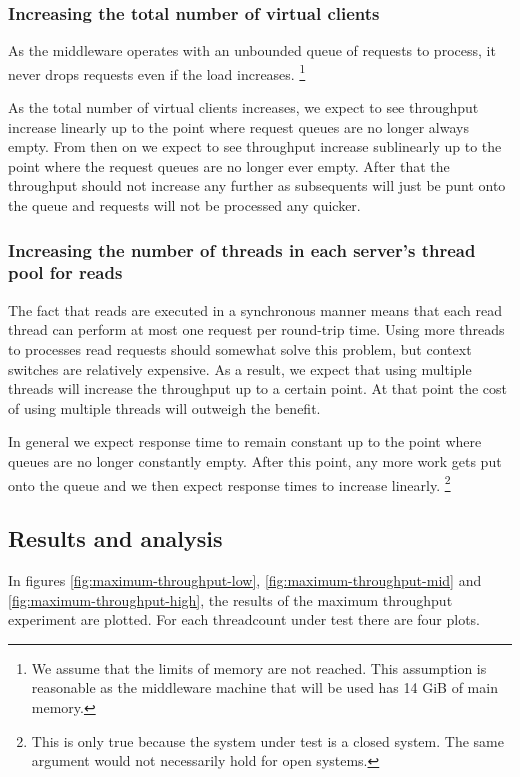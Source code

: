 \documentclass[11pt]{article}
\begin{document}
\subsubsection{Increasing the total number of virtual clients}

As the middleware operates with an unbounded queue of requests to process, it never drops requests even if the load increases.
\footnote{
  We assume that the limits of memory are not reached.
  This assumption is reasonable as the middleware machine that will be used has 14 GiB of main memory.
}

As the total number of virtual clients increases, we expect to see throughput increase linearly up to the point where request queues are no longer always empty.
From then on we expect to see throughput increase sublinearly up to the point where the request queues are no longer ever empty.
After that the throughput should not increase any further as subsequents will just be punt onto the queue and requests will not be processed any quicker.

\subsubsection{Increasing the number of threads in each server's thread pool for reads}

The fact that reads are executed in a synchronous manner means that each read thread can perform at most one request per round-trip time.
Using more threads to processes read requests should somewhat solve this problem, but context switches are relatively expensive.
As a result, we expect that using multiple threads will increase the throughput up to a certain point.
At that point the cost of using multiple threads will outweigh the benefit.

In general we expect response time to remain constant up to the point where queues are no longer constantly empty.
After this point, any more work gets put onto the queue and we then expect response times to increase linearly.
\footnote{
  This is only true because the system under test is a closed system.
  The same argument would not necessarily hold for open systems.
}

\subsection{Results and analysis}

In figures \ref{fig:maximum-throughput-low}, \ref{fig:maximum-throughput-mid} and \ref{fig:maximum-throughput-high}, the results of the maximum throughput experiment are plotted.
For each threadcount under test there are four plots.
\end{document}
